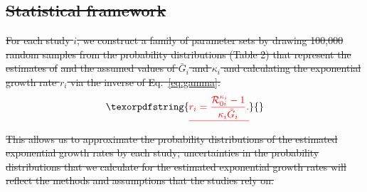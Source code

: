 \documentclass[12pt]{article}
\newcommand{\eref}[1]{Eq.~\ref{eq:#1}}
\newcommand{\Rx}[1]{\ensuremath{{\mathcal R}_{#1}}\xspace}
\providecommand{\DIFdeltex}[1]{{\protect\color{red}\sout{#1}}}                      %
\providecommand{\DIFdel}[1]{\texorpdfstring{\DIFdeltex{#1}}{}} %
\begin{document}
\subsection{\DIFdel{Statistical framework}}
\addtocounter{subsection}{-1}%

\DIFdel{For each study $i$, we construct a family of parameter sets by drawing 100,000 random samples from the probability distributions (Table 2) that represent the estimates of }%
\DIFdel{and the assumed values of $\bar G_i$ and $\kappa_i$ and calculating the exponential growth rate $r_i$ via the inverse of \eref{gamma}:
}%
\begin{displaymath}
\DIFdel{r_i = \frac{\Rx{0i}^{\kappa_i} - 1}{\kappa_i \bar{G}_i}.
}\end{displaymath}%
\DIFdel{This allows us to approximate the probability distributions of the estimated exponential growth rates by each study;
uncertainties in the probability distributions that we calculate for the estimated exponential growth rates will reflect the methods and assumptions that the studies rely on.
}%
\end{document}
